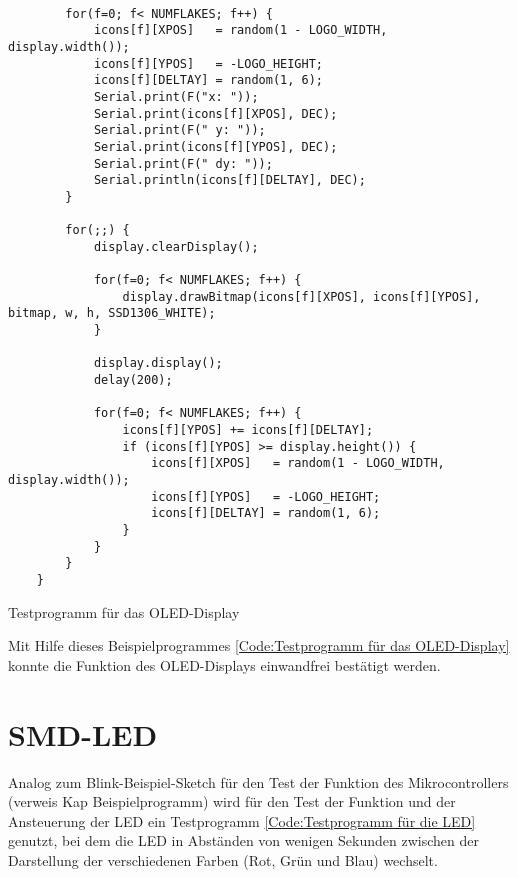 \begin{code} [H]	
\begin{lstlisting} 
		
		for(f=0; f< NUMFLAKES; f++) {
			icons[f][XPOS]   = random(1 - LOGO_WIDTH, display.width());
			icons[f][YPOS]   = -LOGO_HEIGHT;
			icons[f][DELTAY] = random(1, 6);
			Serial.print(F("x: "));
			Serial.print(icons[f][XPOS], DEC);
			Serial.print(F(" y: "));
			Serial.print(icons[f][YPOS], DEC);
			Serial.print(F(" dy: "));
			Serial.println(icons[f][DELTAY], DEC);
		}
		
		for(;;) {
			display.clearDisplay();
			
			for(f=0; f< NUMFLAKES; f++) {
				display.drawBitmap(icons[f][XPOS], icons[f][YPOS], bitmap, w, h, SSD1306_WHITE);
			}
			
			display.display();
			delay(200);
			
			for(f=0; f< NUMFLAKES; f++) {
				icons[f][YPOS] += icons[f][DELTAY];
				if (icons[f][YPOS] >= display.height()) {
					icons[f][XPOS]   = random(1 - LOGO_WIDTH, display.width());
					icons[f][YPOS]   = -LOGO_HEIGHT;
					icons[f][DELTAY] = random(1, 6);
				}
			}
		}
	}
\end{lstlisting}      

\caption[Testprogramm für das OLED-Display]{Testprogramm für das OLED-Display}\label{Code:Testprogramm für das OLED-Display}    
\end{code} 

Mit Hilfe dieses Beispielprogrammes \ref{Code:Testprogramm für das OLED-Display} konnte die Funktion des OLED-Displays einwandfrei bestätigt werden.

\section{SMD-LED}

Analog zum Blink-Beispiel-Sketch für den Test der Funktion des Mikrocontrollers (verweis Kap Beispielprogramm) wird für den Test der Funktion und der Ansteuerung der LED ein Testprogramm \ref{Code:Testprogramm für die LED} genutzt, bei dem die LED in Abständen von wenigen Sekunden zwischen der Darstellung der verschiedenen Farben (Rot, Grün und Blau) wechselt.

